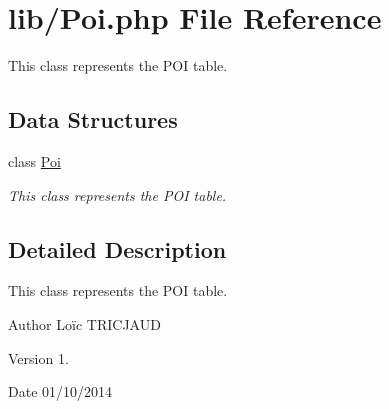 \hypertarget{_poi_8php}{\section{lib/\-Poi.php File Reference}
\label{_poi_8php}
}


This class represents the P\-O\-I table.  


\subsection*{Data Structures}
\begin{DoxyCompactItemize}
\item 
class \hyperlink{class_poi}{Poi}
\begin{DoxyCompactList}\small\item\em This class represents the P\-O\-I table. \end{DoxyCompactList}\end{DoxyCompactItemize}


\subsection{Detailed Description}
This class represents the P\-O\-I table. \begin{DoxyAuthor}{Author}
Loïc T\-R\-I\-C\-J\-A\-U\-D 
\end{DoxyAuthor}
\begin{DoxyVersion}{Version}
1. 
\end{DoxyVersion}
\begin{DoxyDate}{Date}
01/10/2014 
\end{DoxyDate}
